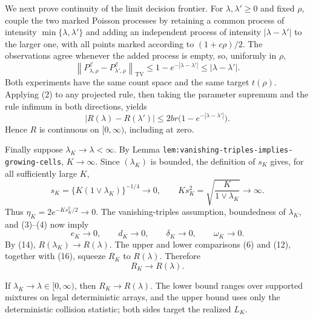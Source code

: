 We next prove continuity of the limit decision frontier.  For \(\lambda,\lambda'\ge0\) and fixed \(\rho\), couple the two marked Poisson processes by retaining a common process of intensity \(\min\{\lambda,\lambda'\}\) and adding an independent process of intensity \(|\lambda-\lambda'|\) to the larger one, with all points marked according to \((1+c\rho)/2\).  The observations agree whenever the added process is empty, so, uniformly in \(\rho\),
\[
 \left\|P^{\mathcal E}_{\lambda,\rho}
       -P^{\mathcal E}_{\lambda',\rho}\right\|_{\mathrm{TV}}
 \le 1-e^{-|\lambda-\lambda'|}
 \le |\lambda-\lambda'|.
 \tag{13}
\]
Both experiments have the same count space and the same target \(t(\rho)\).  Applying (2) to any projected rule, then taking the parameter supremum and the rule infimum in both directions, yields
\[
 |R(\lambda)-R(\lambda')|
 \le 2br\bigl(1-e^{-|\lambda-\lambda'|}\bigr).
 \tag{14}
\]
Hence \(R\) is continuous on \([0,\infty)\), including at zero.

Finally suppose \(\lambda_K\to\lambda<\infty\).  By Lemma \texttt{lem:vanishing-triples-implies-growing-cells}, \(K\to\infty\).  Since \((\lambda_K)\) is bounded, the definition of \(s_K\) gives, for all sufficiently large \(K\),
\[
 s_K=\{K(1\vee\lambda_K)\}^{-1/4}\longrightarrow0,
 \qquad
 Ks_K^2=\sqrt{\frac{K}{1\vee\lambda_K}}\longrightarrow\infty.
 \tag{15}
\]
Thus \(\eta_K=2e^{-Ks_K^2/2}\to0\).  The vanishing-triples assumption, boundedness of \(\lambda_K\), and (3)--(4) now imply
\[
 e_K\to0,
 \qquad d_K\to0,
 \qquad \delta_K\to0,
 \qquad \omega_K\to0.
 \tag{16}
\]
By (14), \(R(\lambda_K)\to R(\lambda)\).  The upper and lower comparisons (6) and (12), together with (16), squeeze \(R_K\) to \(R(\lambda)\).  Therefore
\[
 R_K\longrightarrow R(\lambda).
\]

If \(\lambda_K\to\lambda\in[0,\infty)\), then \(R_K\to R(\lambda)\). The lower bound ranges over supported mixtures on legal deterministic arrays, and the upper bound uses only the deterministic collision statistic; both sides target the realized \(L_K\).

